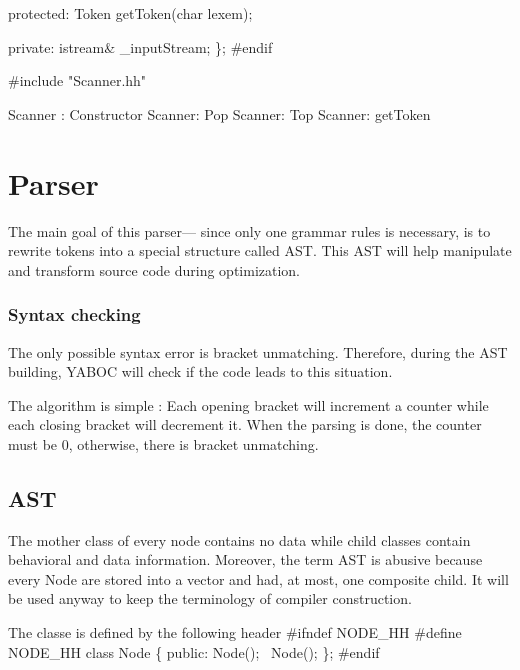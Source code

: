   protected:
    Token getToken(char lexem);

        private:
                istream& _inputStream;
\};
#endif
\nwendcode{}\nwdocspar

\nwenddocs{}\endmoddef\nwstartdeflinemarkup\nwenddeflinemarkup
#include "Scanner.hh"

\LA{}Scanner : Constructor\RA{}
\LA{}Scanner: Pop\RA{}
\LA{}Scanner: Top\RA{}
\LA{}Scanner: getToken\RA{}
\nwendcode{}\nwdocspar
\nwenddocs{}\section{Parser}
The main goal of this parser--- since only one grammar rules is necessary, is to
rewrite tokens into a special structure called \gls{AST}. This \gls{AST} will 
help manipulate and transform source code during optimization. 

\subsubsection{Syntax checking}
The only possible syntax error is bracket unmatching. Therefore, during the 
\gls{AST} building, YABOC will check if the code leads to this situation.

The algorithm is simple : Each opening bracket will increment a counter while 
each closing bracket will decrement it. When the parsing is done, the counter 
must be $0$, otherwise, there is bracket unmatching. 


\subsection{AST}
The mother class of every node contains no data while child classes contain 
behavioral and data information. Moreover, the term \gls{AST} is abusive 
because every Node are stored into a vector and had, at most, one composite 
child.  It will be used anyway to keep the terminology of compiler construction.

\newpar The classe is defined by the following header 
\nwenddocs{}\endmoddef\nwstartdeflinemarkup\nwenddeflinemarkup
#ifndef NODE_HH
#define NODE_HH
class Node \{
        public:
                Node();
                ~Node();
\};
#endif
\nwendcode{}\nwdocspar

